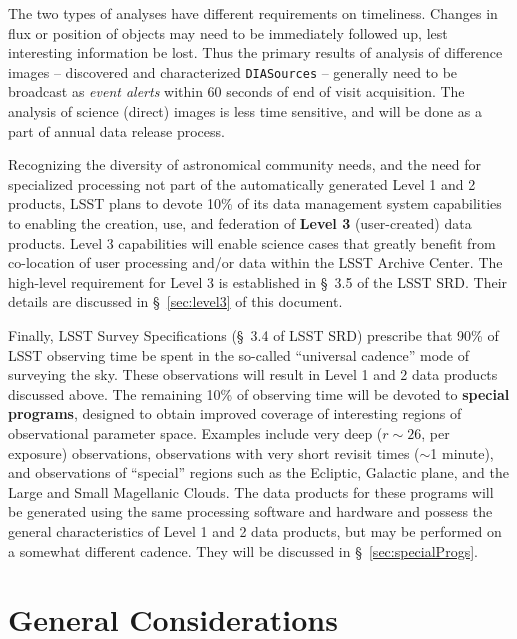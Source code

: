 \documentclass[12pt]{article}
\newcommand{\code}[1]{\texttt{#1}}
\newcommand{\DIASources}{\code{DIASources}\xspace}
\newcommand{\req}[1]{\marginpar{\tiny #1}}
\newcommand{\dmreq}[1]{\req{DMS-REQ-#1}}
\begin{document}
The two types of analyses have different requirements on timeliness. Changes in flux or position of objects may need to be immediately followed up, lest interesting information be lost. Thus the primary results of analysis of difference images -- discovered and characterized \DIASources{} -- generally need to be broadcast as \emph{event alerts} within 60 seconds\req{OTT1} of end of visit acquisition.\dmreq{0004} The analysis of science (direct) images is less time sensitive, and will be done as a part of annual data release process.

\vspace{1em}

Recognizing the diversity of astronomical community needs, and the need for specialized processing not part of the automatically generated Level 1 and 2 products, LSST plans to devote 10\% of its data management system capabilities to enabling the creation, use, and federation of \textbf{Level 3} (user-created) data products. Level 3 capabilities will enable science cases that greatly benefit from co-location of user processing and/or data within the LSST Archive Center. The high-level requirement for Level 3 is established in \S~3.5 of the LSST SRD. Their details are discussed in \S~\ref{sec:level3} of this document.

\vspace{1em}

Finally, LSST Survey Specifications (\S~3.4 of LSST SRD) prescribe that 90\% of LSST observing time be spent in the so-called ``universal cadence'' mode of surveying the sky. These observations will result in Level 1 and 2 data products discussed above. The remaining 10\% of observing time will be devoted to \textbf{special programs}, designed to obtain improved coverage of interesting regions of observational parameter space. Examples include very deep ($r \sim 26$, per exposure) observations, observations with very short revisit times ($\sim$1 minute), and observations of ``special'' regions such as the Ecliptic, Galactic plane, and the Large and Small Magellanic Clouds. The data products for these programs will be generated using the same processing software and hardware and possess the general characteristics of Level 1 and 2 data products, but may be performed on a somewhat different cadence. They will be discussed in \S~\ref{sec:specialProgs}.


\section{General Considerations}
\end{document}
